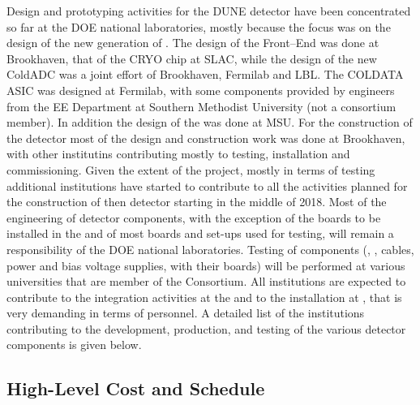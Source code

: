 Design and prototyping activities for the  DUNE detector have 
been concentrated so far at the DOE national laboratories, mostly
because the focus was on the design of the new generation of 
. The design of the Front--End  was
done at Brookhaven, that of the CRYO chip at SLAC, while the
design of the new ColdADC was a joint effort of Brookhaven,
Fermilab and LBL. The COLDATA ASIC was designed at Fermilab, with
some components provided by engineers from the EE Department
at Southern Methodist University (not a consortium member).
In addition the design of the  was done at MSU.
For the construction of the  detector most of the
design and construction work was done at Brookhaven, with other
institutins contributing mostly to testing, installation and
commissioning. Given the extent of the project, mostly in
terms of testing additional institutions have started to contribute
to all the activities planned for the construction of then 
 detector starting in the middle of 2018. Most
of the engineering of detector components, with the exception
of the boards to be installed in the  and of
most boards and set-ups used for testing, will remain a responsibility
of the DOE national laboratories. Testing of components
(, , cables, power and bias voltage supplies,
 with their boards) will be performed at various
universities that are member of the Consortium. All institutions
are expected to contribute to the integration activities at
the  and to the installation at \surf, that is very
demanding in terms of personnel. A detailed list of the 
institutions contributing to the development, production, and
testing of the various detector components is given below.

\subsection{High-Level Cost and Schedule}
\label{sec:fdsp-tpcelec-management-cost}

